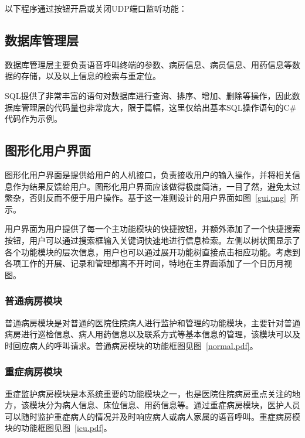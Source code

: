 以下程序通过按钮开启或关闭UDP端口监听功能：\\


\subsection{数据库管理层}
数据库管理层主要负责语音呼叫终端的参数、病房信息、病员信息、用药信息等数据的存储，以及以上信息的检索与重定位。

SQL提供了非常丰富的语句对数据库进行查询、排序、增加、删除等操作，因此数据库管理层的代码量也非常庞大，限于篇幅，这里仅给出基本SQL操作语句的C{\#}代码作为示例。\\


\subsection{图形化用户界面}
图形化用户界面是提供给用户的人机接口，负责接收用户的输入操作，并将相关信息作为结果反馈给用户。图形化用户界面应该做得极度简洁，一目了然，避免太过繁杂，否则反而不便于用户操作。基于这一准则设计的用户界面如图~\ref{gui.png}~所示。

用户界面为用户提供了每一个主功能模块的快捷按钮，并额外添加了一个快捷搜索按钮，用户可以通过搜索框输入关键词快速地进行信息检索。左侧以树状图显示了各个功能模块的层次信息，用户也可以通过展开功能树直接点击相应功能。考虑到各项工作的开展、记录和管理都离不开时间，特地在主界面添加了一个日历月视图。

\subsubsection{普通病房模块}
普通病房模块是对普通的医院住院病人进行监护和管理的功能模块，主要针对普通病房进行巡检信息、病人用药信息以及联系方式等基本信息的管理，该模块可以及时回应病人的呼叫请求。普通病房模块的功能框图见图~\ref{normal.pdf}。

\subsubsection{重症病房模块}
重症监护病房模块是本系统重要的功能模块之一，也是医院住院病房重点关注的地方，该模块分为病人信息、床位信息、用药信息等。通过重症病房模块，医护人员可以随时监护重症病人的情况并及时响应病人或病人家属的语音呼叫。重症病房模块的功能框图见图~\ref{icu.pdf}。

